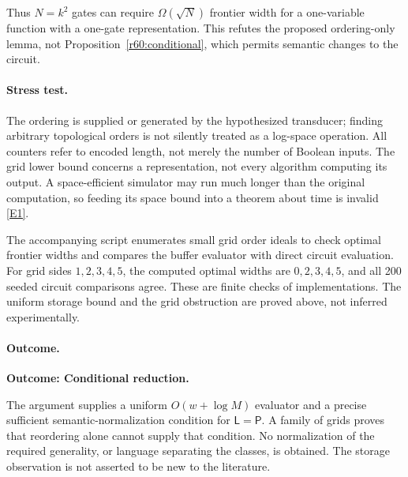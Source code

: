 \documentclass[11pt,a4paper]{article}
\newcommand{\eref}[2]{\hyperlink{extra:#1:#2}{[E#2]}}
\numberwithin{equation}{section}
\begin{document}
Thus $N=k^2$ gates can require $\Omega(\sqrt N)$ frontier width for a one-variable function with a one-gate representation. This refutes the proposed ordering-only lemma, not Proposition~\ref{r60:conditional}, which permits semantic changes to the circuit.

\paragraph{Stress test.}
The ordering is supplied or generated by the hypothesized transducer; finding arbitrary topological orders is not silently treated as a log-space operation. All counters refer to encoded length, not merely the number of Boolean inputs. The grid lower bound concerns a representation, not every algorithm computing its output. A space-efficient simulator may run much longer than the original computation, so feeding its space bound into a theorem about time is invalid \eref{statement}{1}.

The accompanying script enumerates small grid order ideals to check optimal frontier widths and compares the buffer evaluator with direct circuit evaluation. For grid sides $1,2,3,4,5$, the computed optimal widths are $0,2,3,4,5$, and all 200 seeded circuit comparisons agree. These are finite checks of implementations. The uniform storage bound and the grid obstruction are proved above, not inferred experimentally.

\paragraph{Outcome.}
\textbf{Outcome: Conditional reduction.}

The argument supplies a uniform $O(w+\log M)$ evaluator and a precise sufficient semantic-normalization condition for $\mathsf L=\mathsf P$. A family of grids proves that reordering alone cannot supply that condition. No normalization of the required generality, or language separating the classes, is obtained. The storage observation is not asserted to be new to the literature.

\end{document}
